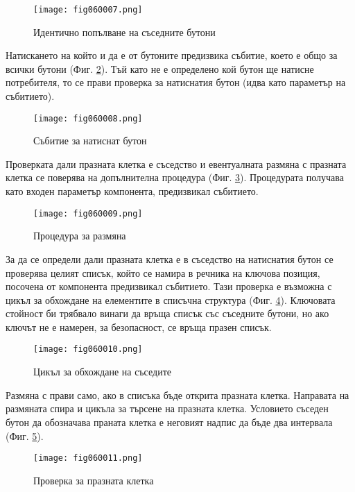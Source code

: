 \begin{figure}[H]
  \centering
  \texttt{[image: fig060007.png]}
  \caption{Идентично попълване на съседните бутони}
\label{fig060007}
\end{figure}

Натискането на който и да е от бутоните предизвика събитие, което е общо за всички бутони (Фиг. \ref{fig060008}). Тъй като не е определено кой бутон ще натисне потребителя, то се прави проверка за натиснатия бутон (идва като параметър на събитието). 

\begin{figure}[H]
  \centering
  \texttt{[image: fig060008.png]}
  \caption{Събитие за натиснат бутон}
\label{fig060008}
\end{figure}

Проверката дали празната клетка е съседство и евентуалната размяна с празната клетка се поверява на допълнителна процедура (Фиг. \ref{fig060009}). Процедурата получава като входен параметър компонента, предизвикал събитието. 

\begin{figure}[H]
  \centering
  \texttt{[image: fig060009.png]}
  \caption{Процедура за размяна}
\label{fig060009}
\end{figure}

За да се определи дали празната клетка е в съседство на натиснатия бутон се проверява целият списък, който се намира в речника на ключова позиция, посочена от компонента предизвикал събитието. Тази проверка е възможна с цикъл за обхождане на елементите в списъчна структура (Фиг. \ref{fig060010}). Ключовата стойност би трябвало винаги да връща списък със съседните бутони, но ако ключът не е намерен, за безопасност, се връща празен списък.

\begin{figure}[H]
  \centering
  \texttt{[image: fig060010.png]}
  \caption{Цикъл за обхождане на съседите}
\label{fig060010}
\end{figure}

Размяна с прави само, ако в списъка бъде открита празната клетка. Направата на размяната спира и цикъла за търсене на празната клетка. Условието съседен бутон да обозначава праната клетка е неговият надпис да бъде два интервала (Фиг. \ref{fig060011}). 

\begin{figure}[H]
  \centering
  \texttt{[image: fig060011.png]}
  \caption{Проверка за празната клетка}
\label{fig060011}
\end{figure}

